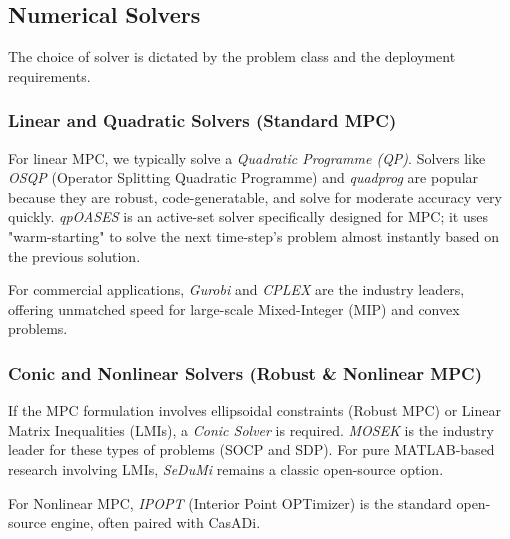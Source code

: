 \subsection{Numerical Solvers}

The choice of solver is dictated by the problem class and the deployment requirements.

\subsubsection*{Linear and Quadratic Solvers (Standard MPC)}
For linear MPC, we typically solve a \emph{Quadratic Programme (QP)}. Solvers like \emph{OSQP} (Operator Splitting Quadratic Programme) and \emph{quadprog} are popular because they are robust, code-generatable, and solve for moderate accuracy very quickly. \emph{qpOASES} is an active-set solver specifically designed for MPC; it uses "warm-starting" to solve the next time-step's problem almost instantly based on the previous solution.

For commercial applications, \emph{Gurobi} and \emph{CPLEX} are the industry leaders, offering unmatched speed for large-scale Mixed-Integer (MIP) and convex problems.

\subsubsection*{Conic and Nonlinear Solvers (Robust \& Nonlinear MPC)}
If the MPC formulation involves ellipsoidal constraints (Robust MPC) or Linear Matrix Inequalities (LMIs), a \emph{Conic Solver} is required. \emph{MOSEK} is the industry leader for these types of problems (SOCP and SDP). For pure MATLAB-based research involving LMIs, \emph{SeDuMi} remains a classic open-source option.

For Nonlinear MPC, \emph{IPOPT} (Interior Point OPTimizer) is the standard open-source engine, often paired with CasADi.

